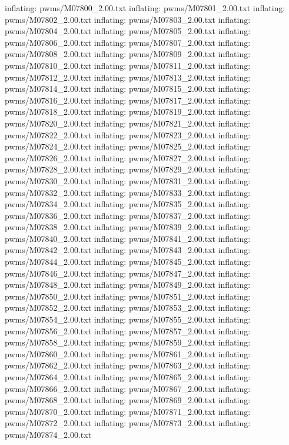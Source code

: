 \documentclass[letterpaper,10pt,english]{sphinxmanual}
\begin{document}
{\begin{sphinxVerbatim}[commandchars=\\\{\}]
  inflating: pwms/M07800\_2.00.txt
  inflating: pwms/M07801\_2.00.txt
  inflating: pwms/M07802\_2.00.txt
  inflating: pwms/M07803\_2.00.txt
  inflating: pwms/M07804\_2.00.txt
  inflating: pwms/M07805\_2.00.txt
  inflating: pwms/M07806\_2.00.txt
  inflating: pwms/M07807\_2.00.txt
  inflating: pwms/M07808\_2.00.txt
  inflating: pwms/M07809\_2.00.txt
  inflating: pwms/M07810\_2.00.txt
  inflating: pwms/M07811\_2.00.txt
  inflating: pwms/M07812\_2.00.txt
  inflating: pwms/M07813\_2.00.txt
  inflating: pwms/M07814\_2.00.txt
  inflating: pwms/M07815\_2.00.txt
  inflating: pwms/M07816\_2.00.txt
  inflating: pwms/M07817\_2.00.txt
  inflating: pwms/M07818\_2.00.txt
  inflating: pwms/M07819\_2.00.txt
  inflating: pwms/M07820\_2.00.txt
  inflating: pwms/M07821\_2.00.txt
  inflating: pwms/M07822\_2.00.txt
  inflating: pwms/M07823\_2.00.txt
  inflating: pwms/M07824\_2.00.txt
  inflating: pwms/M07825\_2.00.txt
  inflating: pwms/M07826\_2.00.txt
  inflating: pwms/M07827\_2.00.txt
  inflating: pwms/M07828\_2.00.txt
  inflating: pwms/M07829\_2.00.txt
  inflating: pwms/M07830\_2.00.txt
  inflating: pwms/M07831\_2.00.txt
  inflating: pwms/M07832\_2.00.txt
  inflating: pwms/M07833\_2.00.txt
  inflating: pwms/M07834\_2.00.txt
  inflating: pwms/M07835\_2.00.txt
  inflating: pwms/M07836\_2.00.txt
  inflating: pwms/M07837\_2.00.txt
  inflating: pwms/M07838\_2.00.txt
  inflating: pwms/M07839\_2.00.txt
  inflating: pwms/M07840\_2.00.txt
  inflating: pwms/M07841\_2.00.txt
  inflating: pwms/M07842\_2.00.txt
  inflating: pwms/M07843\_2.00.txt
  inflating: pwms/M07844\_2.00.txt
  inflating: pwms/M07845\_2.00.txt
  inflating: pwms/M07846\_2.00.txt
  inflating: pwms/M07847\_2.00.txt
  inflating: pwms/M07848\_2.00.txt
  inflating: pwms/M07849\_2.00.txt
  inflating: pwms/M07850\_2.00.txt
  inflating: pwms/M07851\_2.00.txt
  inflating: pwms/M07852\_2.00.txt
  inflating: pwms/M07853\_2.00.txt
  inflating: pwms/M07854\_2.00.txt
  inflating: pwms/M07855\_2.00.txt
  inflating: pwms/M07856\_2.00.txt
  inflating: pwms/M07857\_2.00.txt
  inflating: pwms/M07858\_2.00.txt
  inflating: pwms/M07859\_2.00.txt
  inflating: pwms/M07860\_2.00.txt
  inflating: pwms/M07861\_2.00.txt
  inflating: pwms/M07862\_2.00.txt
  inflating: pwms/M07863\_2.00.txt
  inflating: pwms/M07864\_2.00.txt
  inflating: pwms/M07865\_2.00.txt
  inflating: pwms/M07866\_2.00.txt
  inflating: pwms/M07867\_2.00.txt
  inflating: pwms/M07868\_2.00.txt
  inflating: pwms/M07869\_2.00.txt
  inflating: pwms/M07870\_2.00.txt
  inflating: pwms/M07871\_2.00.txt
  inflating: pwms/M07872\_2.00.txt
  inflating: pwms/M07873\_2.00.txt
  inflating: pwms/M07874\_2.00.txt

\end{sphinxVerbatim}}
\end{document}

